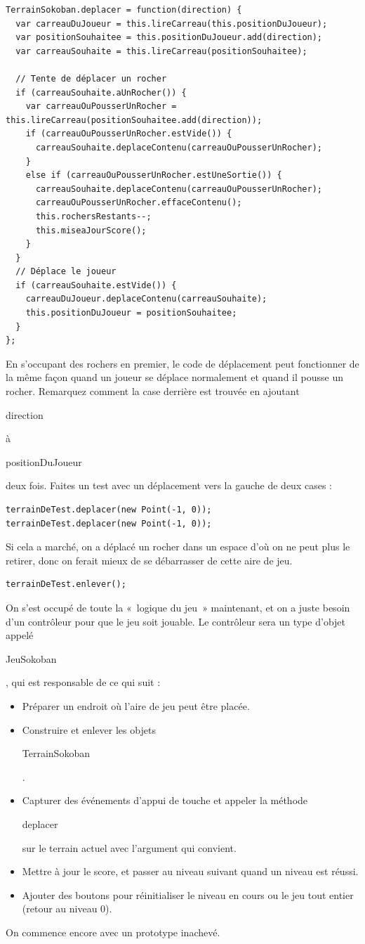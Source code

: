 \documentclass{FramateX}
\renewcommand{\texttt}[1]{\begin{sffamily}{#1}\end{sffamily}}
\begin{document}
\begin{lstlisting}
TerrainSokoban.deplacer = function(direction) {
  var carreauDuJoueur = this.lireCarreau(this.positionDuJoueur);
  var positionSouhaitee = this.positionDuJoueur.add(direction);
  var carreauSouhaite = this.lireCarreau(positionSouhaitee);

  // Tente de déplacer un rocher
  if (carreauSouhaite.aUnRocher()) {
    var carreauOuPousserUnRocher = this.lireCarreau(positionSouhaitee.add(direction));
    if (carreauOuPousserUnRocher.estVide()) {
      carreauSouhaite.deplaceContenu(carreauOuPousserUnRocher);
    }
    else if (carreauOuPousserUnRocher.estUneSortie()) {
      carreauSouhaite.deplaceContenu(carreauOuPousserUnRocher);
      carreauOuPousserUnRocher.effaceContenu();
      this.rochersRestants--;
      this.miseaJourScore();
    }
  }
  // Déplace le joueur
  if (carreauSouhaite.estVide()) {
    carreauDuJoueur.deplaceContenu(carreauSouhaite);
    this.positionDuJoueur = positionSouhaitee;
  }
};
\end{lstlisting}
En s'occupant des rochers en premier, le code de déplacement peut
fonctionner de la même façon quand un joueur se déplace normalement et
quand il pousse un rocher. Remarquez comment la case derrière est
trouvée en ajoutant \texttt{direction} à \texttt{positionDuJoueur} deux
fois. Faites un test avec un déplacement vers la gauche de deux cases :

\begin{lstlisting}
terrainDeTest.deplacer(new Point(-1, 0));
terrainDeTest.deplacer(new Point(-1, 0));
\end{lstlisting}
Si cela a marché, on a déplacé un rocher dans un espace d'où on ne peut
plus le retirer, donc on ferait mieux de se débarrasser de cette aire de
jeu.

\begin{lstlisting}
terrainDeTest.enlever();
\end{lstlisting}
\begin{center}\end{center}

On s'est occupé de toute la «~logique du jeu~» maintenant, et on a juste
besoin d'un contrôleur pour que le jeu soit jouable. Le contrôleur sera
un type d'objet appelé \texttt{JeuSokoban}, qui est responsable de ce
qui suit :

\begin{itemize}
\item
  Préparer un endroit où l'aire de jeu peut être placée.
\item
  Construire et enlever les objets \texttt{TerrainSokoban}.
\item
  Capturer des événements d'appui de touche et appeler la méthode
  \texttt{deplacer} sur le terrain actuel avec l'argument qui convient.
\item
  Mettre à jour le score, et passer au niveau suivant quand un niveau
  est réussi.
\item
  Ajouter des boutons pour réinitialiser le niveau en cours ou le jeu
  tout entier (retour au niveau 0).
\end{itemize}
On commence encore avec un prototype inachevé.
\end{document}
